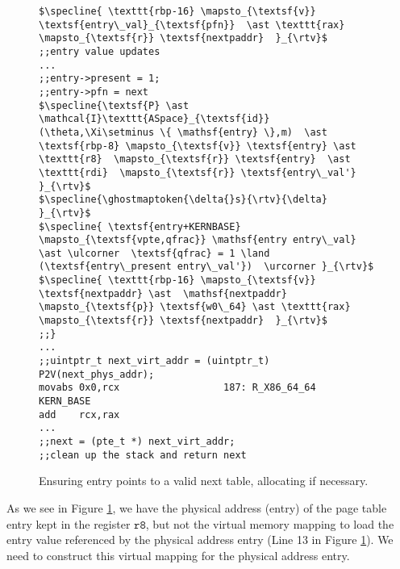 \begin{figure}
\begin{lstlisting}[mathescape]
$\specline{ \texttt{rbp-16} \mapsto_{\textsf{v}} \textsf{entry\_val}_{\textsf{pfn}}  \ast \texttt{rax} \mapsto_{\textsf{r}} \textsf{nextpaddr}  }_{\rtv}$
;;entry value updates
...
;;entry->present = 1;
;;entry->pfn = next
$\specline{\textsf{P} \ast \mathcal{I}\texttt{ASpace}_{\textsf{id}}(\theta,\Xi\setminus \{ \mathsf{entry} \},m)  \ast \textsf{rbp-8} \mapsto_{\textsf{v}} \textsf{entry} \ast \texttt{r8}  \mapsto_{\textsf{r}} \textsf{entry}  \ast \texttt{rdi}  \mapsto_{\textsf{r}} \textsf{entry\_val'}  }_{\rtv}$
$\specline{\ghostmaptoken{\delta{}s}{\rtv}{\delta}  }_{\rtv}$
$\specline{ \textsf{entry+KERNBASE} \mapsto_{\textsf{vpte,qfrac}} \mathsf{entry entry\_val} \ast \ulcorner  \textsf{qfrac} = 1 \land (\textsf{entry\_present entry\_val'})  \urcorner }_{\rtv}$
$\specline{ \texttt{rbp-16} \mapsto_{\textsf{v}} \textsf{nextpaddr} \ast  \mathsf{nextpaddr} \mapsto_{\textsf{p}} \textsf{w0\_64} \ast \texttt{rax} \mapsto_{\textsf{r}} \textsf{nextpaddr}  }_{\rtv}$
;;}
...
;;uintptr_t next_virt_addr = (uintptr_t) P2V(next_phys_addr);
movabs 0x0,rcx	                187: R_X86_64_64	KERN_BASE
add    rcx,rax
...
;;next = (pte_t *) next_virt_addr;
;;clean up the stack and return next
\end{lstlisting}
\vspace{-1em}
\caption{Ensuring \textsf{entry} points to a valid next table, allocating if necessary.}
\label{fig:calltopteinitialize}
\end{figure}

As we see in Figure \ref{fig:calltopteinitialize}, we have the physical address (\textsf{entry}) of the page table entry kept in the register $\texttt{r8}$, but not the virtual memory mapping to load the entry value referenced by the physical address \textsf{entry} (Line 13 in Figure \ref{fig:calltopteinitialize}). We need to construct this virtual mapping for the physical address \textsf{entry}.
